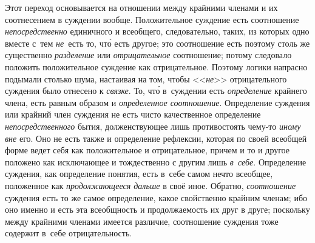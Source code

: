 Этот переход основывается на отношении между крайними членами и их соотнесением
в суждении вообще. Положительное суждение есть соотношение
{\em непосредственно} единичного и всеобщего, следовательно, таких, из которых
одно вместе с~тем {\em не}~есть то, чт\'{о} есть другое; это соотношение есть
поэтому столь же существенно {\em разделение} или {\em отрицательное}
соотношение; потому следовало положить положительное суждение как отрицательное.
Поэтому логики напрасно подымали столько шума, настаивая на том, чтобы
<<{\em не}>> отрицательного суждения было отнесено к {\em связке}. То, чт\'{о}
в~суждении есть {\em определение} крайнего члена, есть равным образом
и {\em определенное соотношение}. Определение суждения или крайний член
суждения не есть чисто качественное определение {\em непосредственного} бытия,
долженствующее лишь противостоять чему-то {\em иному вне} его. Оно не есть
также и определение рефлексии, которая по своей всеобщей форме ведет себя как
положительное и отрицательное, причем и то и другое положено как исключающее и
тождественно с другим лишь {\em в~себе}. Определение суждения, как определение
понятия, есть в~себе самом нечто всеобщее, положенное как {\em продолжающееся
дальше} в своё иное. Обратно, {\em соотношение} суждения есть то же самое
определение, какое свойственно крайним членам; ибо оно именно и есть эта
всеобщность и продолжаемость их друг в друге; поскольку между крайними членами
имеется различие, соотношение суждения тоже содержит в~себе отрицательность.

